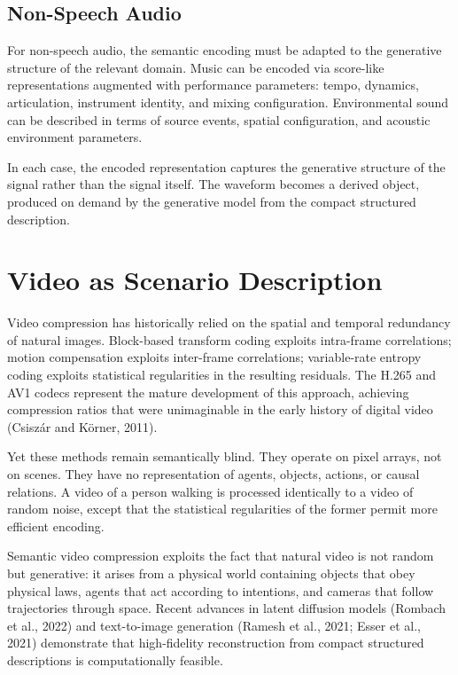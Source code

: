 \documentclass[11pt,a4paper]{article}
\theoremstyle{definition}
\theoremstyle{remark}
\begin{document}
\subsection{Non-Speech Audio}

For non-speech audio, the semantic encoding must be adapted to the generative structure of the relevant domain. Music can be encoded via score-like representations augmented with performance parameters: tempo, dynamics, articulation, instrument identity, and mixing configuration. Environmental sound can be described in terms of source events, spatial configuration, and acoustic environment parameters.

In each case, the encoded representation captures the generative structure of the signal rather than the signal itself. The waveform becomes a derived object, produced on demand by the generative model from the compact structured description.

\section{Video as Scenario Description}
\label{sec:video}

Video compression has historically relied on the spatial and temporal redundancy of natural images. Block-based transform coding exploits intra-frame correlations; motion compensation exploits inter-frame correlations; variable-rate entropy coding exploits statistical regularities in the resulting residuals. The H.265 and AV1 codecs represent the mature development of this approach, achieving compression ratios that were unimaginable in the early history of digital video (Csisz\'{a}r and K\"{o}rner, 2011).

Yet these methods remain semantically blind. They operate on pixel arrays, not on scenes. They have no representation of agents, objects, actions, or causal relations. A video of a person walking is processed identically to a video of random noise, except that the statistical regularities of the former permit more efficient encoding.

Semantic video compression exploits the fact that natural video is not random but generative: it arises from a physical world containing objects that obey physical laws, agents that act according to intentions, and cameras that follow trajectories through space. Recent advances in latent diffusion models (Rombach et al., 2022) and text-to-image generation (Ramesh et al., 2021; Esser et al., 2021) demonstrate that high-fidelity reconstruction from compact structured descriptions is computationally feasible.
\end{document}
